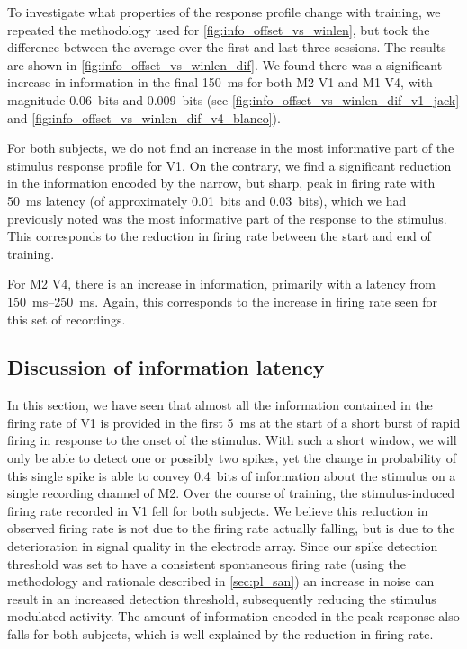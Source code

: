 To investigate what properties of the response profile change with training, we repeated the methodology used for \autoref{fig:info_offset_vs_winlen}, but took the difference between the average over the first and last three sessions.
The results are shown in \autoref{fig:info_offset_vs_winlen_dif}.
We found there was a significant increase in information in the final \SI{150}{\milli\second} for both \ac{M2} \ac{V1} and \ac{M1} \ac{V4}, with magnitude \SI{0.06}{bits} and \SI{0.009}{bits} (see \autoref{fig:info_offset_vs_winlen_dif_v1_jack} and \autoref{fig:info_offset_vs_winlen_dif_v4_blanco}).

For both subjects, we do not find an increase in the most informative part of the stimulus response profile for \ac{V1}.
On the contrary, we find a significant reduction in the information encoded by the narrow, but sharp, peak in firing rate with \SI{50}{\milli\second} latency (of approximately \SI{0.01}{bits} and \SI{0.03}{bits}), which we had previously noted was the most informative part of the response to the stimulus.
This corresponds to the reduction in firing rate between the start and end of training.

For \ac{M2} \ac{V4}, there is an increase in information, primarily with a latency from \SIrange{150}{250}{\milli\second}.
Again, this corresponds to the increase in firing rate seen for this set of recordings.


\subsection{Discussion of information latency}

In this section, we have seen that almost all the information contained in the firing rate of \ac{V1} is provided in the first \SI{5}{\milli\second} at the start of a short burst of rapid firing in response to the onset of the stimulus.
With such a short window, we will only be able to detect one or possibly two spikes, yet the change in probability of this single spike is able to convey \SI{0.4}{bits} of information about the stimulus on a single recording channel of \ac{M2}.
Over the course of training, the stimulus-induced firing rate recorded in \ac{V1} fell for both subjects.
We believe this reduction in observed firing rate is not due to the firing rate actually falling, but is due to the deterioration in signal quality in the electrode array.
Since our spike detection threshold was set to have a consistent spontaneous firing rate (using the methodology and rationale described in \autoref{sec:pl_san}) an increase in noise can result in an increased detection threshold, subsequently reducing the stimulus modulated activity.
The amount of information encoded in the peak response also falls for both subjects, which is well explained by the reduction in firing rate.

